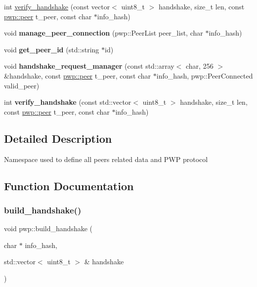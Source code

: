 \begin{DoxyCompactItemize}
int \hyperlink{namespacepwp_a58c780495f2139a56b95662dc7c0345f}{verify\+\_\+handshake} (const vector$<$ uint8\+\_\+t $>$ handshake, size\+\_\+t len, const \hyperlink{structpwp_1_1peer}{pwp\+::peer} t\+\_\+peer, const char $\ast$info\+\_\+hash)
\item 
\mbox{\label{namespacepwp_ab82c0d015f6ba23e766c4b942a125b5f}} 
void {\bfseries manage\+\_\+peer\+\_\+connection} (pwp\+::\+Peer\+List peer\+\_\+list, char $\ast$info\+\_\+hash)
\item 
\mbox{\label{namespacepwp_a5f03cde749af88a393c999545830b192}} 
void {\bfseries get\+\_\+peer\+\_\+id} (std\+::string $\ast$id)
\item 
\mbox{\label{namespacepwp_ae2eeca61e271fabff5fa45308396009e}} 
void {\bfseries handshake\+\_\+request\+\_\+manager} (const std\+::array$<$ char, 256 $>$ \&handshake, const \hyperlink{structpwp_1_1peer}{pwp\+::peer} t\+\_\+peer, const char $\ast$info\+\_\+hash, pwp\+::\+Peer\+Connected valid\+\_\+peer)
\item 
\mbox{\label{namespacepwp_aed118903b8345e62507ade49c6032d32}} 
int {\bfseries verify\+\_\+handshake} (const std\+::vector$<$ uint8\+\_\+t $>$ handshake, size\+\_\+t len, const \hyperlink{structpwp_1_1peer}{pwp\+::peer} t\+\_\+peer, const char $\ast$info\+\_\+hash)
\end{DoxyCompactItemize}


\subsection{Detailed Description}
Namespace used to define all peer\textquotesingle{}s related data and P\+WP protocol 

\subsection{Function Documentation}
\mbox{\label{namespacepwp_a6062876f4d4d4d6ee19341a79a797864}} 
\subsubsection{\texorpdfstring{build\+\_\+handshake()}{build\_handshake()}}
{\footnotesize\ttfamily void pwp\+::build\+\_\+handshake (\begin{DoxyParamCaption}\item[{char $\ast$}]{info\+\_\+hash,  }\item[{std\+::vector$<$ uint8\+\_\+t $>$ \&}]{handshake }\end{DoxyParamCaption})}

